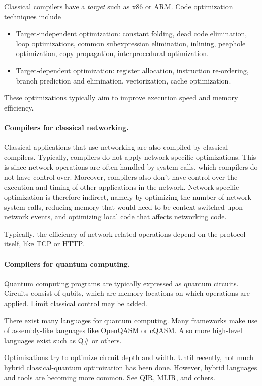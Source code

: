 Classical compilers have a \textit{target} such as x86 or ARM.
Code optimization techniques include
\begin{itemize}
  \item Target-independent optimization: constant folding, dead code elimination, loop optimizations, common subexpression elimination, inlining, peephole optimization, copy propagation, interprocedural optimization.
  \item Target-dependent optimization: register allocation, instruction re-ordering, branch prediction and elimination, vectorization, cache optimization.
\end{itemize}
These optimizations typically aim to improve execution speed and memory efficiency.

\paragraph{Compilers for classical networking.}
Classical applications that use networking are also compiled by classical compilers.
Typically, compilers do not apply network-specific optimizations.
This is since network operations are often handled by system calls, which compilers do not have control over.
Moreover, compilers also don't have control over the execution and timing of other applications in the network.
Network-specific optimization is therefore indirect, namely by optimizing the number of network system calls, reducing memory that would need to be context-switched upon network events, and optimizing local code that affects networking code.

Typically, the efficiency of network-related operations depend on the protocol itself, like TCP or HTTP. 

\paragraph{Compilers for quantum computing.}
Quantum computing programs are typically expressed as quantum circuits.
Circuits consist of qubits, which are memory locations on which operations are applied.
Limit classical control may be added.

There exist many languages for quantum computing.
Many frameworks make use of assembly-like languages like OpenQASM or cQASM.
Also more high-level languages exist such as Q\# or others.

Optimizations try to optimize circuit depth and width.
Until recently, not much hybrid classical-quantum optimization has been done.
However, hybrid languages and tools are becoming more common.
See QIR, MLIR, and others.

